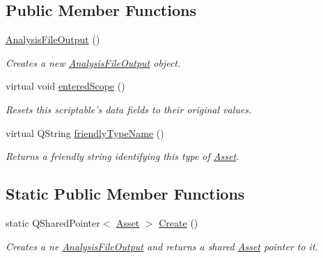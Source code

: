 \subsection*{Public Member Functions}
\begin{DoxyCompactItemize}
\item 
\hyperlink{class_picto_1_1_analysis_file_output_a81230443a2e3188b183fab6e2c336267}{Analysis\-File\-Output} ()
\begin{DoxyCompactList}\small\item\em Creates a new \hyperlink{class_picto_1_1_analysis_file_output}{Analysis\-File\-Output} object. \end{DoxyCompactList}\item 
virtual void \hyperlink{class_picto_1_1_analysis_file_output_a3ac925e5bde617041be98d36bae5ece0}{entered\-Scope} ()
\begin{DoxyCompactList}\small\item\em Resets this scriptable's data fields to their original values. \end{DoxyCompactList}\item 
virtual Q\-String \hyperlink{class_picto_1_1_analysis_file_output_aaf859ca4eccd3f735c8a4690e7357b6c}{friendly\-Type\-Name} ()
\begin{DoxyCompactList}\small\item\em Returns a friendly string identifying this type of \hyperlink{class_picto_1_1_asset}{Asset}. \end{DoxyCompactList}\end{DoxyCompactItemize}
\subsection*{Static Public Member Functions}
\begin{DoxyCompactItemize}
\item 
\hypertarget{class_picto_1_1_analysis_file_output_a7eca1cdb286782978b17388c4b0ab540}{static Q\-Shared\-Pointer$<$ \hyperlink{class_picto_1_1_asset}{Asset} $>$ \hyperlink{class_picto_1_1_analysis_file_output_a7eca1cdb286782978b17388c4b0ab540}{Create} ()}\label{class_picto_1_1_analysis_file_output_a7eca1cdb286782978b17388c4b0ab540}

\begin{DoxyCompactList}\small\item\em Creates a ne \hyperlink{class_picto_1_1_analysis_file_output}{Analysis\-File\-Output} and returns a shared \hyperlink{class_picto_1_1_asset}{Asset} pointer to it. \end{DoxyCompactList}\end{DoxyCompactItemize}
